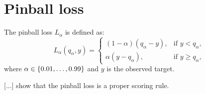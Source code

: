 \section{Pinball loss}
\label{sec:pinball-loss}

The pinball loss \(L_\alpha\) is defined as: 
\[ L_\alpha(q_\alpha, y) = \begin{cases}
    (1-\alpha)(q_\alpha - y), &\text{if } y < q_\alpha, \\
    \alpha(y - q_\alpha), &\text{if } y \geq q_\alpha,
\end{cases} \]
where \(\alpha \in \{0.01, \ldots, 0.99\}\) and \(y\) is the observed target.

[...] show that the pinball loss is a proper scoring rule.
